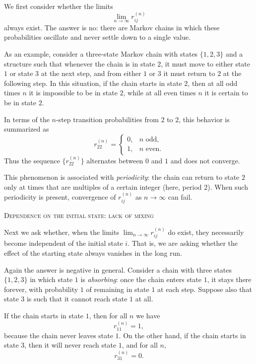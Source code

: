 We first consider whether the limits
\[
\lim_{n \to \infty} r_{ij}^{(n)}
\]
always exist.
The answer is no: there are Markov chains in which these probabilities oscillate and never settle down to a single value.

As an example, consider a three-state Markov chain with states \(\{1,2,3\}\) and a structure such that whenever the chain is in state \(2\), it must move to either state \(1\) or state \(3\) at the next step, and from either \(1\) or \(3\) it must return to \(2\) at the following step.
In this situation, if the chain starts in state \(2\), then at all odd times \(n\) it is impossible to be in state \(2\), while at all even times \(n\) it is certain to be in state \(2\).

In terms of the \(n\)-step transition probabilities from \(2\) to \(2\), this behavior is summarized as
\[
r_{22}^{(n)} =
\begin{cases}
0, & n \text{ odd}, \\
1, & n \text{ even}.
\end{cases}
\]
Thus the sequence \(\{r_{22}^{(n)}\}\) alternates between \(0\) and \(1\) and does not converge.

This phenomenon is associated with \textit{periodicity}: the chain can return to state \(2\) only at times that are multiples of a certain integer (here, period \(2\)).
When such periodicity is present, convergence of \(r_{ij}^{(n)}\) as \(n \to \infty\) can fail.

\bigskip
\textsc{Dependence on the initial state: lack of mixing}

Next we ask whether, when the limits \(\lim_{n \to \infty} r_{ij}^{(n)}\) do exist, they necessarily become independent of the initial state \(i\).
That is, we are asking whether the effect of the starting state always vanishes in the long run.

Again the answer is negative in general.
Consider a chain with three states \(\{1,2,3\}\) in which state \(1\) is \textit{absorbing}: once the chain enters state \(1\), it stays there forever, with probability \(1\) of remaining in state \(1\) at each step.
Suppose also that state \(3\) is such that it cannot reach state \(1\) at all.

If the chain starts in state \(1\), then for all \(n\) we have
\[
r_{11}^{(n)} = 1,
\]
because the chain never leaves state \(1\).
On the other hand, if the chain starts in state \(3\), then it will never reach state \(1\), and for all \(n\),
\[
r_{31}^{(n)} = 0.
\]

